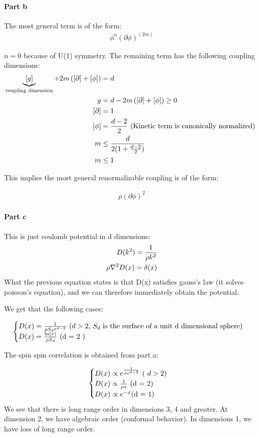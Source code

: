 \documentclass[10pt]{scrartcl}
\begin{document}
\paragraph{Part b}
The most general term is of the form:
\begin{align}
\phi^n (\partial \phi)^(2m)
\end{align}

$n = 0$ because of U(1) symmetry.  The remaining term has the following coupling dimensions:
\begin{align}
\underbrace{[g]}_{\text{coupling dimension}} + 2m \left( [\partial] + [\phi] \right) & = d \\
g &= d- 2m \left( [\partial] + [\phi] \right) \geq 0 \\
[\partial]  &= 1 \\
[\phi] &= {d - 2 \over 2}  \text{ (Kinetic term is canonically normalized) } \\
m & \leq {d \over 2 (1 + {d-2 \over 2})} \\
m & \leq 1
\end{align}

This implies the most general renormalizable coupling is of the form:

\begin{align}
\rho (\partial \phi)^2
\end{align}

\paragraph{Part c}
This is just coulomb potential in d dimensions:
\begin{align}
D(k^2) = {1 \over \rho k^2}  \\
\rho \nabla^2 D(x) =  \delta(x) \\
\end{align} 
What the previous equation states is that D(x) satisfies gauss's law (it solves poisson's equation),
and we can therefore immediately obtain the potential.

We get that the following cases:

\begin{align}
\begin{cases}
D(x) = {1 \over \rho S_d r^{d-2}} \text{ ($d > 2$, $S_d$ is the surface of a unit d dimensional sphere)} \\
D(x) = { \ln(r) \over \rho S_d} \text{ (d = 2 )}
\end{cases}
\end{align}


The spin spin correlation is obtained from part a:

\begin{align}
\begin{cases}
D(x) \propto e^{1 \over \rho x^{d-2}}  \text{ ( $d > 2$)} \\
D(x) \propto {1 \over \rho x} \text{ (d = 2)} \\
D(x) \propto e^{-x} \text{(d = 1)} 
\end{cases}
\end{align}
We see that there is long range order in dimensions 3, 4 and greater.  At dimension 2, we have algebraic order (conformal behavior).
In dimensions 1, we have loss of long range order.
\end{document}
